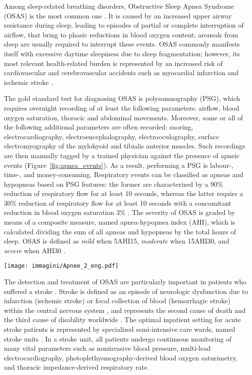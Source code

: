 \documentclass[5p,twocolumn,lefttitle]{elsarticle}
\begin{document}
Among sleep-related breathing disorders, Obstructive Sleep Apnea Syndrome (OSAS) is the most common one \cite{pmid27568340}. It is caused by an increased upper airway resistance during sleep, leading to episodes of partial or complete interruption of airflow, that bring to phasic reductions in blood oxygen content; arousals from sleep are usually required to interrupt these events. OSAS commonly manifests itself with excessive daytime sleepiness due to sleep fragmentation; however, its most relevant health-related burden is represented by an increased risk of cardiovascular and cerebrovascular accidents such as myocardial infarction and ischemic stroke \cite{pmid24321805}.


The gold standard test for diagnosing OSAS is polysomnography (PSG), which requires overnight recording of at least the following parameters: airflow, blood oxygen saturation, thoracic and abdominal movements. Moreover, some or all of the following additional parameters are often recorded: snoring, electrocardiography, electroencephalography, electrooculography, surface electromyography of the mylohyoid and tibialis anterior muscles. 
Such recordings are then manually tagged by a trained physician against the presence of apneic events (Figure~\ref{fig:apnea_events}). 
As a result, performing a PSG is labour-, time-, and money-consuming.
Respiratory events can be classified as apneas and hypopneas based on PSG features: the former are characterized by a 90\% reduction of respiratory flow for at least 10 seconds, whereas the latter require a 30\% reduction of respiratory flow for at least 10 seconds with a concomitant reduction in blood oxygen saturation 3\% \cite{pmid23066376}. The severity of OSAS is graded by means of a composite measure, named apnea-hypopnea index (AHI), which is calculated dividing the sum of all apneas and hypopneas by the total hours of sleep. OSAS is defined as \emph{mild} when 5AHI15, \emph{moderate} when 15AHI30, and \emph{severe} when AHI30 \cite{PMID:28211654}.

\begin{figure*}[t]
    \centering
    \texttt{[image: immagini/Apnee\_2\_eng.pdf]}
    \caption{Polysomnographic recording showing some different apnea events.}
    \label{fig:apnea_events}
\end{figure*}

The detection and treatment of OSAS are particularly important in patients who suffered a stroke \cite{pmid29523641}. Stroke is defined as an episode of neurologic dysfunction due to infarction (ischemic stroke) 
or focal collection of blood (hemorrhagic stroke) 
within the central nervous system \cite{pmid23652265}, and represents the second cause of death and the third cause of disability worldwide \cite{GlobalBurdenOfDisease}. The optimal inpatient setting for acute stroke patients is represented by specialized semi-intensive care wards, named stroke units \cite{pmid29367334}. In a stroke unit, all patients undergo continuous monitoring of many vital parameters such as noninvasive blood pressure, multi-lead electrocardiography, photoplethysmography-derived blood oxygen saturimetry, and thoracic impedance-derived respiratory rate.
\end{document}
